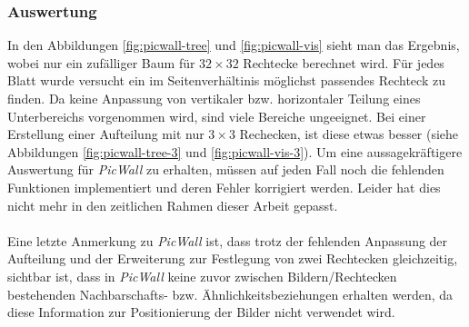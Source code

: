 \documentclass[12pt, ngerman, utf8]{article}
\begin{document}
\subsubsection{Auswertung}
In den Abbildungen \ref{fig:picwall-tree} und \ref{fig:picwall-vis} sieht man das Ergebnis, wobei nur ein zufälliger Baum für $32 \times 32$ Rechtecke berechnet wird. Für jedes Blatt wurde versucht ein im Seitenverhältinis möglichst passendes Rechteck zu finden. Da keine Anpassung von vertikaler bzw. horizontaler Teilung eines Unterbereichs vorgenommen wird, sind viele Bereiche ungeeignet. Bei einer Erstellung einer Aufteilung mit nur $3 \times 3$ Rechecken, ist diese etwas besser (siehe Abbildungen \ref{fig:picwall-tree-3} und \ref{fig:picwall-vis-3}). Um eine aussagekräftigere Auswertung für \emph{PicWall} zu erhalten, müssen auf jeden Fall noch die fehlenden Funktionen implementiert und deren Fehler korrigiert werden. Leider hat dies nicht mehr in den zeitlichen Rahmen dieser Arbeit gepasst.\\\\
Eine letzte Anmerkung zu \emph{PicWall} ist, dass trotz der fehlenden Anpassung der Aufteilung und der Erweiterung zur Festlegung von zwei Rechtecken gleichzeitig, sichtbar ist, dass in \emph{PicWall} keine zuvor zwischen Bildern/Rechtecken bestehenden Nachbarschafts- bzw. Ähnlichkeitsbeziehungen erhalten werden, da diese Information zur Positionierung der Bilder nicht verwendet wird.
 
\end{document}
